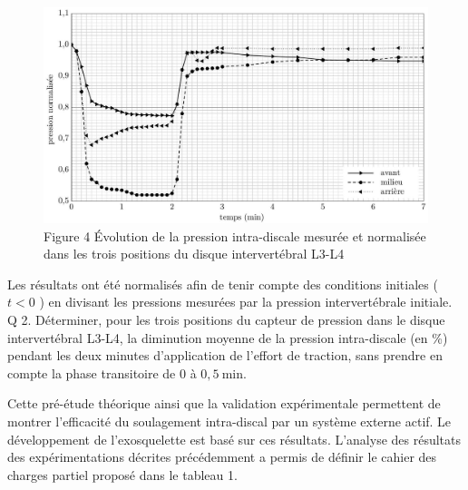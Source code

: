 \documentclass[10pt]{article}
\begin{document}
\begin{figure}[h]
\begin{center}
  \includegraphics[width=\textwidth]{2025_09_16_5f2d7643f7e649c6833dg-03}
\captionsetup{labelformat=empty}
\caption{Figure 4 Évolution de la pression intra-discale mesurée et normalisée dans les trois positions du disque intervertébral L3-L4}
\end{center}
\end{figure}

Les résultats ont été normalisés afin de tenir compte des conditions initiales ( $t<0$ ) en divisant les pressions mesurées par la pression intervertébrale initiale.\\
Q 2. Déterminer, pour les trois positions du capteur de pression dans le disque intervertébral L3-L4, la diminution moyenne de la pression intra-discale (en \%) pendant les deux minutes d'application de l'effort de traction, sans prendre en compte la phase transitoire de 0 à $0,5 \mathrm{~min}$.

Cette pré-étude théorique ainsi que la validation expérimentale permettent de montrer l'efficacité du soulagement intra-discal par un système externe actif. Le développement de l'exosquelette est basé sur ces résultats. L'analyse des résultats des expérimentations décrites précédemment a permis de définir le cahier des charges partiel proposé dans le tableau 1.
\end{document}
